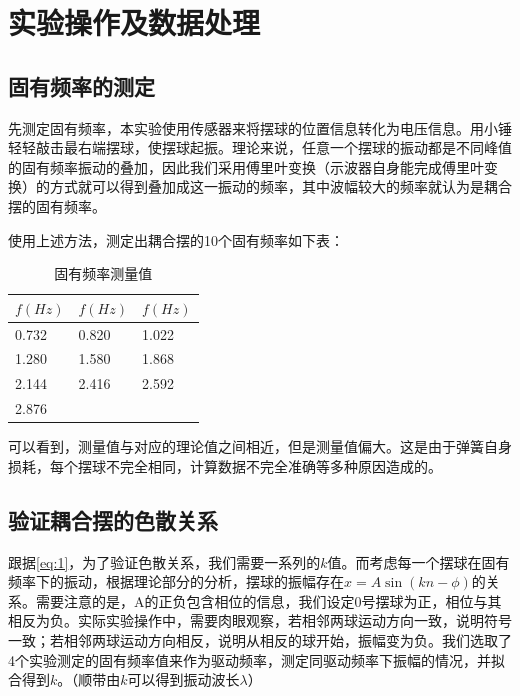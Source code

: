 \documentclass[fleqn,10pt]{SelfArx} %
\begin{document}

\section{实验操作及数据处理}

\subsection{固有频率的测定}

先测定固有频率，本实验使用传感器来将摆球的位置信息转化为电压信息。用小锤轻轻敲击最右端摆球，使摆球起振。理论来说，任意一个摆球的振动都是不同峰值的固有频率振动的叠加，因此我们采用傅里叶变换（示波器自身能完成傅里叶变换）的方式就可以得到叠加成这一振动的频率，其中波幅较大的频率就认为是耦合摆的固有频率。

使用上述方法，测定出耦合摆的10个固有频率如下表：

\begin{table}[htbp]
\centering
\begin{tabular}{|l|l|l|}
\hline
$f(Hz)$ & $f(Hz)$ & $f(Hz)$ \\ \hline
0.732        & 0.820        & 1.022        \\ \hline
1.280        & 1.580        & 1.868        \\ \hline
2.144        & 2.416        & 2.592        \\ \hline
2.876        &              &              \\ \hline
\end{tabular}
\caption{固有频率测量值}
\label{tab:2}
\end{table}

可以看到，测量值与对应的理论值之间相近，但是测量值偏大。这是由于弹簧自身损耗，每个摆球不完全相同，计算数据不完全准确等多种原因造成的。

\subsection{验证耦合摆的色散关系}

跟据\ref{eq:1}，为了验证色散关系，我们需要一系列的$k$值。而考虑每一个摆球在固有频率下的振动，根据理论部分的分析，摆球的振幅存在$x=A\sin(kn-\phi)$的关系。需要注意的是，A的正负包含相位的信息，我们设定0号摆球为正，相位与其相反为负。实际实验操作中，需要肉眼观察，若相邻两球运动方向一致，说明符号一致；若相邻两球运动方向相反，说明从相反的球开始，振幅变为负。我们选取了4个实验测定的固有频率值来作为驱动频率，测定同驱动频率下振幅的情况，并拟合得到$k$。（顺带由$k$可以得到振动波长$\lambda$）
\end{document}
